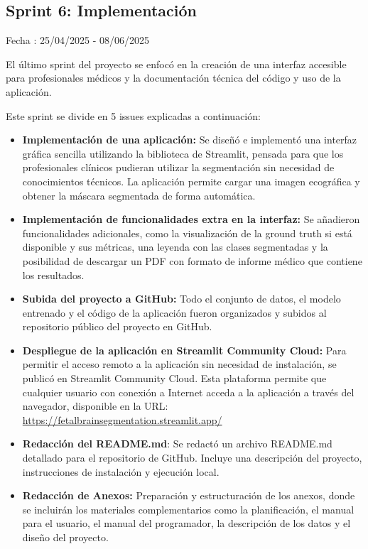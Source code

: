 \subsection{Sprint 6: Implementación}

Fecha : 25/04/2025 - 08/06/2025

El último sprint del proyecto se enfocó en la creación de una interfaz accesible para profesionales médicos y la documentación técnica del código y uso de la aplicación.

Este sprint se divide en 5 issues explicadas a continuación:
\begin{itemize}
    \item \textbf{Implementación de una aplicación:} Se diseñó e implementó una interfaz gráfica sencilla utilizando la biblioteca de Streamlit, pensada para que los profesionales clínicos pudieran utilizar la segmentación sin necesidad de conocimientos técnicos. La aplicación permite cargar una imagen ecográfica y obtener la máscara segmentada de forma automática.
    \item \textbf{Implementación de funcionalidades extra en la interfaz:} Se añadieron funcionalidades adicionales, como la visualización de la ground truth si está disponible y sus métricas, una leyenda con las clases segmentadas y la posibilidad de descargar un PDF con formato de informe médico que contiene los resultados. 
    \item \textbf{Subida del proyecto a GitHub:} Todo el conjunto de datos, el modelo entrenado y el código de la aplicación fueron organizados y subidos al repositorio público del proyecto en GitHub. 
    \item \textbf{Despliegue de la aplicación en Streamlit Community Cloud:} Para permitir el acceso remoto a la aplicación sin necesidad de instalación, se publicó en Streamlit Community Cloud. Esta plataforma permite que cualquier usuario con conexión a Internet acceda a la aplicación a través del navegador, disponible en la URL: \url{https://fetalbrainsegmentation.streamlit.app/}
    \item \textbf{Redacción del README.md}: Se redactó un archivo README.md detallado para el repositorio de GitHub. Incluye una descripción del proyecto, instrucciones de instalación y ejecución local.
    \item \textbf{Redacción de Anexos:} Preparación y estructuración de los anexos, donde se incluirán los materiales complementarios como  la planificación, el manual para el usuario, el manual del programador, la descripción de los datos y el diseño del proyecto.
\end{itemize}


